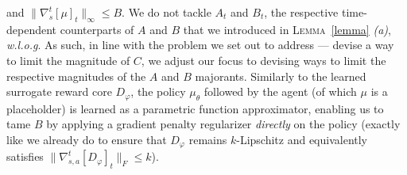 and $\lVert\nabla_s^t[\mu]_t\rVert _\infty \leq B$.
We do not tackle $A_t$ and $B_t$, the respective time-dependent counterparts of $A$ and $B$ that we introduced
in \textsc{Lemma}~\ref{lemma} \textit{(a)}, \textit{w.l.o.g}.
As such, in line with the problem we set out to address --- devise a way to limit the magnitude of $C$,
we adjust our focus to devising ways to limit the respective magnitudes of the $A$ and $B$ majorants.
Similarly to the learned surrogate reward core $D_\varphi$, the policy $\mu_\theta$
followed by the agent (of which $\mu$ is a placeholder) is learned as a parametric
function approximator, enabling us to tame $B$ by applying a gradient penalty regularizer
\emph{directly} on the policy (exactly like we already do to ensure that $D_\varphi$
remains $k$-Lipschitz and equivalently
satisfies $\lVert \nabla_{s,a}^t[D_\varphi]_t \rVert _F \leq k$).

